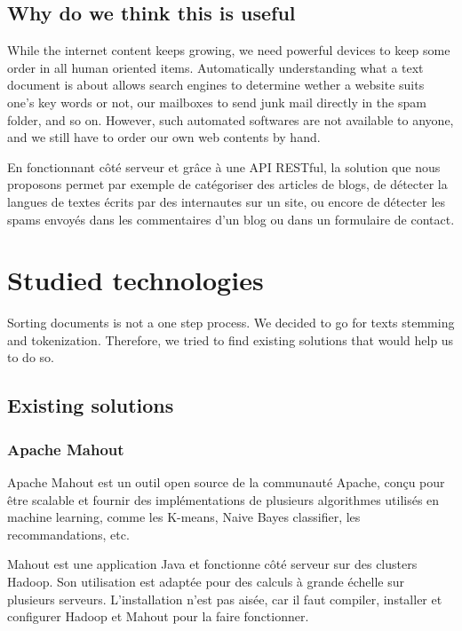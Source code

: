 \documentclass[a4paper,11pt]{article}
\begin{document}
\subsection{Why do we think this is useful}

While the internet content keeps growing, we need powerful devices to keep
some order in all human oriented items. Automatically understanding what a
text document is about allows search engines to determine wether a website
suits one's key words or not, our mailboxes to send junk mail directly in the
spam folder, and so on. However, such automated softwares are not available to
anyone, and we still have to order our own web contents by hand.

En fonctionnant côté serveur et grâce à une API RESTful, la solution que nous
proposons permet par exemple de catégoriser des articles de blogs, de détecter
la langues de textes écrits par des internautes sur un site, ou encore de
détecter les spams envoyés dans les commentaires d'un blog ou dans un
formulaire de contact.


\section{Studied technologies}

Sorting documents is not a one step process. We decided to go for texts
stemming and tokenization. Therefore, we tried to find existing solutions that
would help us to do so.

\subsection{Existing solutions}
    
\subsubsection{Apache Mahout}

Apache Mahout est un outil open source de la communauté Apache, conçu pour
être scalable et fournir des implémentations de plusieurs algorithmes utilisés
en machine learning, comme les K-means, Naive Bayes classifier, les
recommandations, etc.

Mahout est une application Java et fonctionne côté serveur sur des clusters
Hadoop. Son utilisation est adaptée pour des calculs à grande échelle sur
plusieurs serveurs. L'installation n'est pas aisée, car il faut compiler,
installer et configurer Hadoop et Mahout pour la faire fonctionner.
\end{document}
